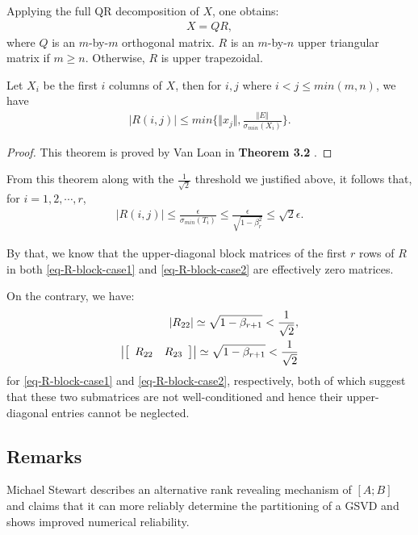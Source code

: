 \begin{remark}
{\begin{theorem}
Applying the full QR decomposition of $X$, one obtains:
\begin{align}
	X = QR,
\end{align}
where $Q$ is an $m$-by-$m$ orthogonal matrix. $R$ is an $m$-by-$n$ upper triangular matrix if $m \geq n$. Otherwise, $R$ is upper trapezoidal. 

Let $X_{i}$ be the first $i$ columns of $X$, then for $i, j$ where $i < j \leq min(m, n)$, we have
\begin{align}
	\left|R(i, j)\right| \leq min\{\Vert x_{j} \Vert, \frac{\Vert E \Vert}{\sigma_{min}(X_{i})} \}.
\end{align}
\end{theorem}

\begin{proof}
This theorem is proved by Van Loan in \textbf{Theorem 3.2} \cite[pp.~484--485]{vanloan85}.
\end{proof}

From this theorem along with the $\frac{1}{\sqrt{2}}$ threshold we justified above, it follows that, for $i = 1, 2, \cdots, r$, 
\begin{align*}
	\left|R(i, j)\right| \leq \frac{\epsilon}{\sigma_{min}(T_{i})} \leq \frac{\epsilon}{\sqrt{1-\beta_{r}^{2}}} \leq \sqrt{2}\epsilon.
\end{align*}

By that, we know that the upper-diagonal block matrices of the first $r$ rows of $R$ in both \eqref{eq-R-block-case1} and \eqref{eq-R-block-case2} are effectively zero matrices. 

On the contrary, we have:
\begin{align} 
\left|R_{22}\right| \simeq \sqrt{1-\beta_{r+1}} < \frac{1}{\sqrt{2}} , \\
\left|\left[ \begin{array}{cc} R_{22} & R_{23} \end{array} \right]\right| \simeq \sqrt{1-\beta_{r+1}} < \frac{1}{\sqrt{2}}
\end{align}
for \eqref{eq-R-block-case1} and \eqref{eq-R-block-case2}, respectively, both of which suggest that these two submatrices are not well-conditioned and hence their upper-diagonal entries cannot be neglected. 
}

\end{remark} 


\subsection{Remarks} 
\begin{remark}
{\rm 
Michael Stewart \cite{stewart2016rank} describes 
an alternative rank revealing mechanism of $[A; B]$ 
and claims that it can more reliably determine 
the partitioning of a GSVD and shows improved numerical reliability.
} \end{remark} 


